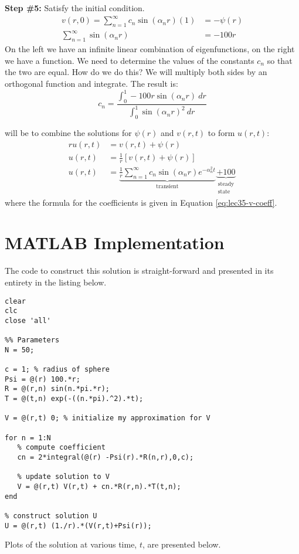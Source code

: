 \noindent\textbf{Step \#5:} Satisfy the initial condition.
\begin{align*}
v(r,0) = \sum\limits_{n=1}^{\infty}c_n \sin{(\alpha_n r)}(1) &= -\psi(r) \\
\sum\limits_{n=1}^{\infty} \sin{(\alpha_n r)} &= -100r 
\end{align*}
On the left we have an infinite linear combination of eigenfunctions, on the right we have a function.  We need to determine the values of the constants $c_n$ so that the two are equal.  How do we do this?  We will multiply both sides by an orthogonal function and integrate.  The result is:
\begin{equation}
c_n = \frac{\int_{0}^1 -100r \sin{(\alpha_n r)} \ dr}{\int_0^1 \sin{(\alpha_n r)}^2 \ dr}
\label{eq:lec35-v-coeff}
\end{equation}

 will be to combine the solutions for $\psi(r)$ and $v(r,t)$ to form $u(r,t)$:
\begin{align*}
ru(r,t) &= v(r,t) + \psi(r) \\
u(r,t) &= \frac{1}{r}\left[ v(r,t) + \psi(r)\right] \\
u(r,t) &= \underbrace{\frac{1}{r}\sum\limits_{n=1}^{\infty}c_n \sin{(\alpha_n r)}e^{-\alpha_n^2 t}}_{\text{transient}} \underbrace{+ 100}_{\substack{\text{steady}\\ \text{state}}} 
\end{align*}
where the formula for the coefficients is given in Equation \ref{eq:lec35-v-coeff}.

\section{MATLAB Implementation}

The code to construct this solution is straight-forward and presented in its entirety in the listing below.

\begin{lstlisting}[name=lec35-ex, style=myMatlab]
clear
clc
close 'all'

%% Parameters
N = 50;

c = 1; % radius of sphere
Psi = @(r) 100.*r;
R = @(r,n) sin(n.*pi.*r);
T = @(t,n) exp(-((n.*pi).^2).*t);

V = @(r,t) 0; % initialize my approximation for V

for n = 1:N
   % compute coefficient
   cn = 2*integral(@(r) -Psi(r).*R(n,r),0,c);
   
   % update solution to V
   V = @(r,t) V(r,t) + cn.*R(r,n).*T(t,n);
end

% construct solution U
U = @(r,t) (1./r).*(V(r,t)+Psi(r));
\end{lstlisting}
Plots of the solution at various time, $t$, are presented below.

